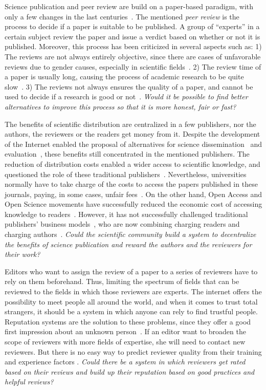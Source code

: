 Science publication and peer review are build on a paper-based paradigm, with
only a few changes in the last centuries~\cite{spier2002history}. The mentioned
\emph{peer review} is the process to decide if a paper is suitable to be
published. A group of ``experts'' in a certain subject review the paper and
issue a verdict based on whether or not it is published. Moreover, this process
has been criticized in several aspects such as: 1) The reviews are not always
entirely objective, since there are cases of unfavorable reviews due to gender
causes, especially in scientific fields~\cite{wenneras2001nepotism}. 2) The
review time of a paper is usually long, causing the process of academic research
to be quite slow~\cite{huisman2017duration}. 3) The reviews not always ensures
the quality of a paper, and cannot be used to decide if a research is good or
not~\cite{goldbeck1999evidence}. \emph{Would it be possible to find better
  alternatives to improve this process so that it is more honest, fair or fast?}

The benefits of scientific distribution are centralized in a few publishers, nor
the authors, the reviewers or the readers get money from it. Despite the
development of the Internet enabled the proposal of alternatives for science
dissemination~\cite{eysenbach2006citation} and
evaluation~\cite{walker_emerging_2015}, these benefits still concentrated in the
mentioned publishers. The reduction of distribution costs enabled a wider access
to scientific knowledge, and questioned the role of these traditional
publishers~\cite{ReinventingRigor}. Nevertheless, universities normally have to
take charge of the costs to access the papers published in these journals,
paying, in some cases, unfair fees~\cite{bergstrom2004costs}. On the other hand, Open Access and
Open Science movements have successfully reduced the economic cost of accessing
knowledge to readers~\cite{evans2009open}. However, it has not successfully
challenged traditional publishers' business
models~\cite{lariviere2015oligopoly}, who are now combining charging readers and
charging authors~\cite{van2013true}. \emph{Could the scientific community build
  a system to decentralize the benefits of science publication and reward the
  authors and the reviewers for their work?}

Editors who want to assign the review of a paper to a series of reviewers have
to rely on them beforehand. Thus, limiting the spectrum of fields that can be
reviewed to the fields in which those reviewers are experts. The internet offers
the possibility to meet people all around the world, and when it comes to trust
total strangers, it should be a system in which anyone can rely to find trustful
people. Reputation systems are the solution to these problems, since they offer
a good first impression about an unknown person~\cite{resnick2000reputation}. If
an editor want to broaden the scope of reviewers with more fields of expertise,
she will need to contact new reviewers. But there is no easy way to predict
reviewer quality from their training and experience factors
\cite{callaham_relationship_2007}. \emph{Could there be a system in which
  reviewers get rated based on their reviews and build up their reputation based
  on good practices and helpful reviews?}

